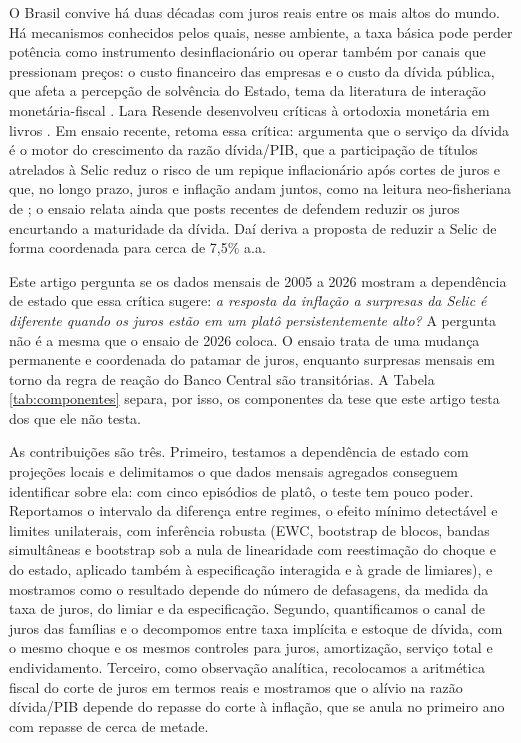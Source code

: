 \documentclass[12pt,a4paper]{article}
\begin{document}
O Brasil convive há duas décadas com juros reais entre os mais altos do mundo. Há mecanismos conhecidos pelos quais, nesse ambiente, a taxa básica pode perder potência como instrumento desinflacionário ou operar também por canais que pressionam preços: o custo financeiro das empresas \citep{barth2001cost, ravenna2006financial} e o custo da dívida pública, que afeta a percepção de solvência do Estado, tema da literatura de interação monetária-fiscal \citep{loyo1999tight, blanchard2005fiscal, favero2005inflation}. Lara Resende desenvolveu críticas à ortodoxia monetária em livros \citep{resende2017juros, resende2020consenso, resende2022camisa}. Em ensaio recente, \citet{resende2026euacuso} retoma essa crítica: argumenta que o serviço da dívida é o motor do crescimento da razão dívida/PIB, que a participação de títulos atrelados à Selic reduz o risco de um repique inflacionário após cortes de juros e que, no longo prazo, juros e inflação andam juntos, como na leitura neo-fisheriana de \citet{cochrane2023fiscal}; o ensaio relata ainda que posts recentes de \citet{cochrane2026reasons} defendem reduzir os juros encurtando a maturidade da dívida. Daí deriva a proposta de reduzir a Selic de forma coordenada para cerca de 7,5\% a.a.

Este artigo pergunta se os dados mensais de 2005 a 2026 mostram a dependência de estado que essa crítica sugere: \emph{a resposta da inflação a surpresas da Selic é diferente quando os juros estão em um platô persistentemente alto?} A pergunta não é a mesma que o ensaio de 2026 coloca. O ensaio trata de uma mudança permanente e coordenada do patamar de juros, enquanto surpresas mensais em torno da regra de reação do Banco Central são transitórias. A Tabela \ref{tab:componentes} separa, por isso, os componentes da tese que este artigo testa dos que ele não testa.

As contribuições são três. Primeiro, testamos a dependência de estado com projeções locais \citep{jorda2005estimation, tenreyro2016pushing, ramey2018government} e delimitamos o que dados mensais agregados conseguem identificar sobre ela: com cinco episódios de platô, o teste tem pouco poder. Reportamos o intervalo da diferença entre regimes, o efeito mínimo detectável e limites unilaterais, com inferência robusta (EWC, bootstrap de blocos, bandas simultâneas e bootstrap sob a nula de linearidade com reestimação do choque e do estado, aplicado também à especificação interagida e à grade de limiares), e mostramos como o resultado depende do número de defasagens, da medida da taxa de juros, do limiar e da especificação. Segundo, quantificamos o canal de juros das famílias e o decompomos entre taxa implícita e estoque de dívida, com o mesmo choque e os mesmos controles para juros, amortização, serviço total e endividamento. Terceiro, como observação analítica, recolocamos a aritmética fiscal do corte de juros em termos reais e mostramos que o alívio na razão dívida/PIB depende do repasse do corte à inflação, que se anula no primeiro ano com repasse de cerca de metade.
\end{document}
